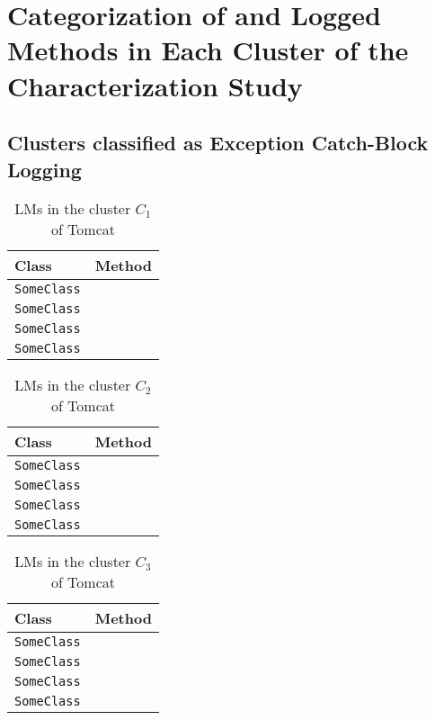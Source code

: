 
\chapter{Categorization of and Logged Methods in Each Cluster of the Characterization Study}\label{appendB}

\section{Clusters classified as Exception Catch-Block Logging}

\begin{table}[!tbh]
\centering\caption{LMs in the cluster $C_1$ of Tomcat}
\begin{tabular}{ll}\toprule
Class&Method\\\midrule
\lstinline/SomeClass/&\raisebox{-2pt}{\lstinline/foo(int)/}\\
\lstinline/SomeClass/&\raisebox{-2pt}{\lstinline/foo(int)/}\\
\lstinline/SomeClass/&\raisebox{-2pt}{\lstinline/foo(int)/}\\
\lstinline/SomeClass/&\raisebox{-2pt}{\lstinline/foo(int)/}\\
\bottomrule
\end{tabular}
\end{table}

\begin{table}[!tbh]
\caption{LMs in the cluster $C_2$ of Tomcat}
\centering\begin{tabular}{ll}\toprule
Class&Method\\\midrule
\lstinline/SomeClass/&\raisebox{-2pt}{\lstinline/foo(int)/}\\
\lstinline/SomeClass/&\raisebox{-2pt}{\lstinline/foo(int)/}\\
\lstinline/SomeClass/&\raisebox{-2pt}{\lstinline/foo(int)/}\\
\lstinline/SomeClass/&\raisebox{-2pt}{\lstinline/foo(int)/}\\
\bottomrule
\end{tabular}
\end{table}

\begin{table}[!tbh]
\caption{LMs in the cluster $C_3$ of Tomcat}
\centering\begin{tabular}{ll}\toprule
Class&Method\\\midrule
\lstinline/SomeClass/&\raisebox{-2pt}{\lstinline/foo(int)/}\\
\lstinline/SomeClass/&\raisebox{-2pt}{\lstinline/foo(int)/}\\
\lstinline/SomeClass/&\raisebox{-2pt}{\lstinline/foo(int)/}\\
\lstinline/SomeClass/&\raisebox{-2pt}{\lstinline/foo(int)/}\\
\bottomrule
\end{tabular}
\end{table}

